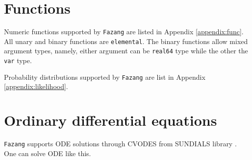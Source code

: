 \documentclass[12pt, reqno, oneside]{amsbook}
\numberwithin{equation}{chapter}
\begin{document}
\section{Functions}
\label{sec:org2b87706}
Numeric functions supported by \texttt{Fazang} are listed in Appendix \ref{appendix:func}. All unary and
binary functions are \texttt{elemental}. The binary functions allow mixed
argument types, namely, either argument can be \texttt{real64} type while the
other the \texttt{var} type.

Probability distributions supported by \texttt{Fazang} are list in Appendix \ref{appendix:likelihood}.

\section{Ordinary differential equations}
\label{sec:orge24bbe8}
\texttt{Fazang} supports ODE solutions through CVODES from SUNDIALS library
\cite{hindmarsh2005sundials}. One can solve ODE like this.
\end{document}
